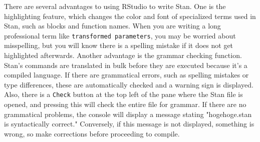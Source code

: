 \documentclass{ltjsbook}
\begin{document}
There are several advantages to using RStudio to write Stan. One is the highlighting feature, which changes the color and font of specialized terms used in Stan, such as blocks and function names. When you are writing a long professional term like \verb|transformed parameters|, you may be worried about misspelling, but you will know there is a spelling mistake if it does not get highlighted afterwards. Another advantage is the grammar checking function. Stan's commands are translated in bulk before they are executed because it's a compiled language. If there are grammatical errors, such as spelling mistakes or type differences, these are automatically checked and a warning sign is displayed. Also, there is a \verb|Check| button at the top left of the pane where the Stan file is opened, and pressing this will check the entire file for grammar. If there are no grammatical problems, the console will display a message stating "hogehoge.stan is syntactically correct." Conversely, if this message is not displayed, something is wrong, so make corrections before proceeding to compile.
\end{document}
